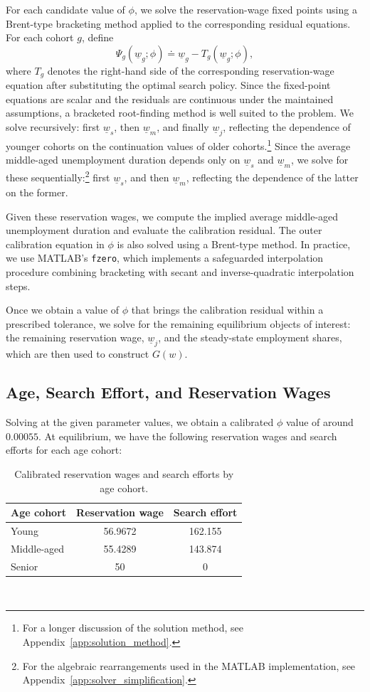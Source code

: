 \documentclass{article}
\newcommand{\lbar}[1]{\underline{#1}} %
\begin{document}
For each candidate value of $\phi$, we solve the reservation-wage fixed points using a Brent-type bracketing method applied to the corresponding residual equations. For each cohort $g$, define
\[
\Psi_g(\lbar w_g;\phi)\doteq \lbar w_g-T_g(\lbar w_g;\phi),
\]
where $T_g$ denotes the right-hand side of the corresponding reservation-wage equation after substituting the optimal search policy. Since the fixed-point equations are scalar and the residuals are continuous under the maintained assumptions, a bracketed root-finding method is well suited to the problem. We solve recursively: first $\lbar w_s$, then $\lbar w_m$, and finally $\lbar w_j$, reflecting the dependence of younger cohorts on the continuation values of older cohorts.\footnote{For a longer discussion of the solution method, see Appendix~\ref{app:solution_method}.} Since the average middle-aged unemployment duration depends only on $\lbar{w}_s$ and $\lbar{w}_m$, we solve for these sequentially:\footnote{For the algebraic rearrangements used in the MATLAB implementation, see Appendix~\ref{app:solver_simplification}.} first $\lbar{w}_s$, and then $\lbar{w}_m$, reflecting the dependence of the latter on the former. 

Given these reservation wages, we compute the implied average middle-aged unemployment duration and evaluate the calibration residual. The outer calibration equation in $\phi$ is also solved using a Brent-type method. In practice, we use MATLAB's \texttt{fzero}, which implements a safeguarded interpolation procedure combining bracketing with secant and inverse-quadratic interpolation steps.

Once we obtain a value of $\phi$ that brings the calibration residual within a prescribed tolerance, we solve for the remaining equilibrium objects of interest: the remaining reservation wage, $\lbar{w}_j$, and the steady-state employment shares, which are then used to construct $G(w)$. 

\subsection{Age, Search Effort, and Reservation Wages}
Solving at the given parameter values, we obtain a calibrated $\phi$ value of around $0.00055$. At equilibrium, we have the following reservation wages and search efforts for each age cohort:
\begin{table}[!ht]
\centering
\begin{tabular}{lcc}
\hline
Age cohort & Reservation wage & Search effort \\
\hline
Young & 56.9672 & 162.155 \\
Middle-aged & 55.4289 & 143.874 \\
Senior & 50 & 0 \\
\hline
\end{tabular}
\caption{Calibrated reservation wages and search efforts by age cohort.}
~\label{tab:rwage_search_effort}
\end{table}
\end{document}
